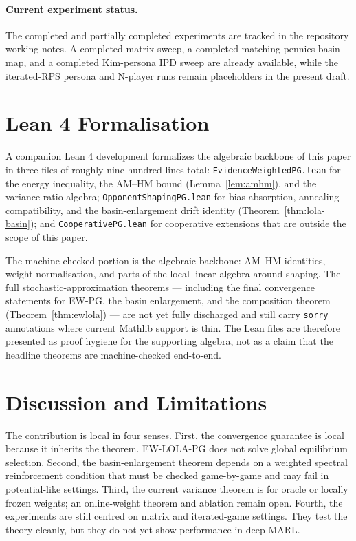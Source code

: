 \documentclass{article}
\theoremstyle{plain}
\theoremstyle{definition}
\theoremstyle{remark}
\begin{document}
\paragraph{Current experiment status.}
The completed and partially completed experiments are tracked in the repository working notes. A completed matrix sweep, a completed matching-pennies basin map, and a completed Kim-persona IPD sweep are already available, while the iterated-RPS persona and N-player runs remain placeholders in the present draft.

\section{Lean 4 Formalisation}

A companion Lean 4 development formalizes the algebraic backbone of this paper in three files of roughly nine hundred lines total: \texttt{EvidenceWeightedPG.lean} for the energy inequality, the AM--HM bound (Lemma~\ref{lem:amhm}), and the variance-ratio algebra; \texttt{OpponentShapingPG.lean} for bias absorption, annealing compatibility, and the basin-enlargement drift identity (Theorem~\ref{thm:lola-basin}); and \texttt{CooperativePG.lean} for cooperative extensions that are outside the scope of this paper.

The machine-checked portion is the algebraic backbone: AM--HM identities, weight normalisation, and parts of the local linear algebra around shaping. The full stochastic-approximation theorems --- including the final convergence statements for EW-PG, the basin enlargement, and the composition theorem (Theorem~\ref{thm:ewlola}) --- are not yet fully discharged and still carry \texttt{sorry} annotations where current Mathlib support is thin. The Lean files are therefore presented as proof hygiene for the supporting algebra, not as a claim that the headline theorems are machine-checked end-to-end.

\section{Discussion and Limitations}

The contribution is local in four senses. First, the convergence guarantee is local because it inherits the \citet{giannou2022convergence} theorem. EW-LOLA-PG does not solve global equilibrium selection. Second, the basin-enlargement theorem depends on a weighted spectral reinforcement condition that must be checked game-by-game and may fail in potential-like settings. Third, the current variance theorem is for oracle or locally frozen weights; an online-weight theorem and ablation remain open. Fourth, the experiments are still centred on matrix and iterated-game settings. They test the theory cleanly, but they do not yet show performance in deep MARL.
\end{document}
